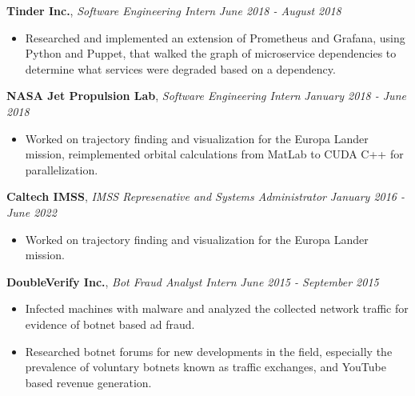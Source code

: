 \documentclass[8pt]{article}
\newenvironment{changemargin}[2]{%
  \begin{list}{}{%
    \setlength{\topsep}{0pt}%
    \setlength{\leftmargin}{#1}%
    \setlength{\rightmargin}{#2}%
    \setlength{\listparindent}{\parindent}%
    \setlength{\itemindent}{\parindent}%
    \setlength{\parsep}{\parskip}%
  }%
  \item[]}{\end{list}
}
\newenvironment{body} {
	\vspace*{-16pt}
	\begin{changemargin}{-0.25in}{-0.5in}
  }	
	{\end{changemargin}
}
\begin{document}
\begin{body}
	\textbf{Tinder Inc.}, \emph{Software Engineering Intern} \hfill \emph{June 2018 - August 2018}\\
	\vspace*{-3pt}
	\begin{itemize} \itemsep -0pt %
		\item Researched and implemented an extension of Prometheus and Grafana, using Python and Puppet, that walked the graph of
		microservice dependencies to determine what services were degraded based on a dependency.
	\end{itemize}
	\vspace*{-4pt}

	\textbf{NASA Jet Propulsion Lab}, \emph{Software Engineering Intern} \hfill \emph{January 2018 - June 2018}\\
	\vspace*{-3pt}
	\begin{itemize} \itemsep -0pt %
		\item Worked on trajectory finding and visualization for the Europa Lander mission, reimplemented orbital calculations from MatLab to CUDA C++ for parallelization.
	\end{itemize}
	\vspace*{-4pt}

	\textbf{Caltech IMSS}, \emph{IMSS Represenative and Systems Administrator} \hfill \emph{January 2016 - June 2022}\\
	\vspace*{-4pt}
	\begin{itemize} \itemsep -0pt %
		\item Worked on trajectory finding and visualization for the Europa Lander mission.
	\end{itemize}
	\vspace*{-4pt}

	\textbf{DoubleVerify Inc.}, \emph{Bot Fraud Analyst Intern} \hfill \emph{June 2015 - September 2015}\\
	\vspace*{-4pt}
	\begin{itemize} \itemsep -0pt %
		\item Infected machines with malware and analyzed the collected network traffic for evidence of botnet based ad fraud.
		\item Researched botnet forums for new developments in the field, especially the prevalence of voluntary botnets known as traffic exchanges, and YouTube based revenue generation.
	\end{itemize}
	\vspace*{-4pt}


\end{body}
\end{document}

